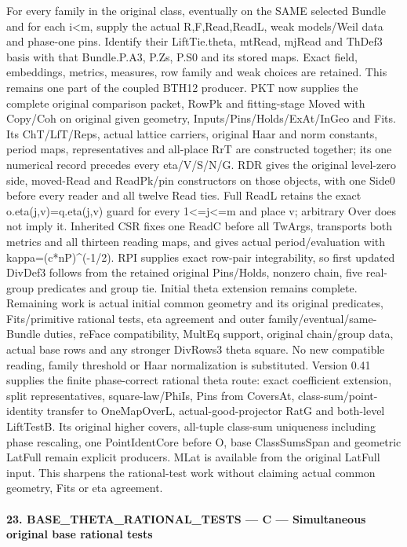 \documentclass[11pt,a4paper]{article}
\numberwithin{equation}{section}
\theoremstyle{remark}\newtheorem{remark}[theorem]{Remark}
\begin{document}
For every family in the original class, eventually on the SAME selected Bundle and for each i<m, supply the actual R,F,Read,ReadL, weak models/Weil data and phase-one pins. Identify their LiftTie.theta, mtRead, mjRead and ThDef3 basis with that Bundle.P.A3, P.Zs, P.S0 and its stored maps. Exact field, embeddings, metrics, measures, row family and weak choices are retained. This remains one part of the coupled BTH12 producer. PKT now supplies the complete original comparison packet, RowPk and fitting-stage Moved with Copy/Coh on original given geometry, Inputs/Pins/Holds/ExAt/InGeo and Fits. Its ChT/LfT/Reps, actual lattice carriers, original Haar and norm constants, period maps, representatives and all-place RrT are constructed together; its one numerical record precedes every eta/V/S/N/G. RDR gives the original level-zero side, moved-Read and ReadPk/pin constructors on those objects, with one Side0 before every reader and all twelve Read ties. Full ReadL retains the exact o.eta(j,v)=q.eta(j,v) guard for every 1<=j<=m and place v; arbitrary Over does not imply it. Inherited CSR fixes one ReadC before all TwArgs, transports both metrics and all thirteen reading maps, and gives actual period/evaluation with kappa=(c*nP)\textasciicircum{}(-1/2). RPI supplies exact row-pair integrability, so first updated DivDef3 follows from the retained original Pins/Holds, nonzero chain, five real-group predicates and group tie. Initial theta extension remains complete. Remaining work is actual initial common geometry and its original predicates, Fits/primitive rational tests, eta agreement and outer family/eventual/same-Bundle duties, reFace compatibility, MultEq support, original chain/group data, actual base rows and any stronger DivRows3 theta square. No new compatible reading, family threshold or Haar normalization is substituted. Version 0.41 supplies the finite phase-correct rational theta route: exact coefficient extension, split representatives, square-law/PhiIs, Pins from CoversAt, class-sum/point-identity transfer to OneMapOverL, actual-good-projector RatG and both-level LiftTestB. Its original higher covers, all-tuple class-sum uniqueness including phase rescaling, one PointIdentCore before O, base ClassSumsSpan and geometric LatFull remain explicit producers. MLat is available from the original LatFull input. This sharpens the rational-test work without claiming actual common geometry, Fits or eta agreement.



\paragraph{23. BASE\_\allowbreak THETA\_\allowbreak RATIONAL\_\allowbreak TESTS — C — Simultaneous original base rational tests}
\end{document}
